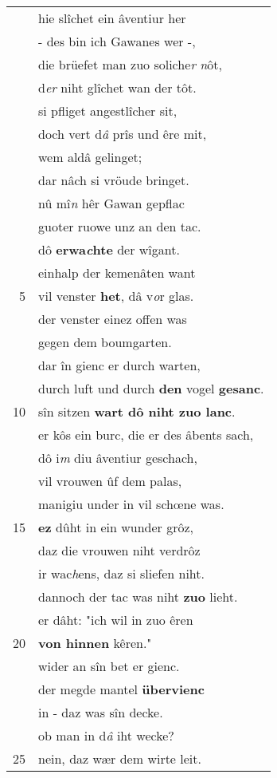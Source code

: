 \documentclass[8pt,a4paper,notitlepage]{article}
\begin{document}
\begin{table}[ht]
\begin{minipage}[t]{0.5\linewidth}
\begin{tabular}{rl}
 & hie slîchet ein âventiur her\\ 
 & - des bin ich Gawanes wer -,\\ 
 & die brüefet man zuo soliche\textit{r} \textit{n}ôt,\\ 
 & d\textit{er} niht glîchet wan der tôt.\\ 
 & si pfliget angestlîcher sit,\\ 
 & doch vert d\textit{â} prîs und êre mit,\\ 
 & wem aldâ gelinget;\\ 
 & dar nâch si vröude bringet.\\ 
 & nû mî\textit{n} hêr Gawan gepflac\\ 
 & guoter ruowe unz an den tac.\\ 
 & dô \textbf{erwa\textit{c}hte} der wîgant.\\ 
 & einhalp der kemenâten want\\ 
5 & vil venster \textbf{het}, dâ v\textit{o}r glas.\\ 
 & der venster einez offen was\\ 
 & gegen dem boumgarten.\\ 
 & dar în gienc er durch warten,\\ 
 & durch luft und durch \textbf{den} vogel \textbf{gesanc}.\\ 
10 & sîn sitzen \textbf{wart dô niht zuo lanc}.\\ 
 & er kôs ein burc, die er des âbents sach,\\ 
 & dô i\textit{m} diu âventiur geschach,\\ 
 & vil vrouwen ûf dem palas,\\ 
 & manigiu under in vil schœne was.\\ 
15 & \textbf{ez} dûht in ein wunder grôz,\\ 
 & daz die vrouwen niht verdrôz\\ 
 & ir wac\textit{h}ens, daz si sliefen niht.\\ 
 & dannoch der tac was niht \textbf{zuo} lieht.\\ 
 & er dâht: "ich wil in zuo êren\\ 
20 & \textbf{von hinnen} kêren."\\ 
 & wider an sîn bet er gienc.\\ 
 & der megde mantel \textbf{übervienc}\\ 
 & in - daz was sîn decke.\\ 
 & ob man in d\textit{â} iht wecke?\\ 
25 & nein, daz wær dem wirte leit.\\ 

\end{tabular}
\end{minipage}
\end{table}
\end{document}
